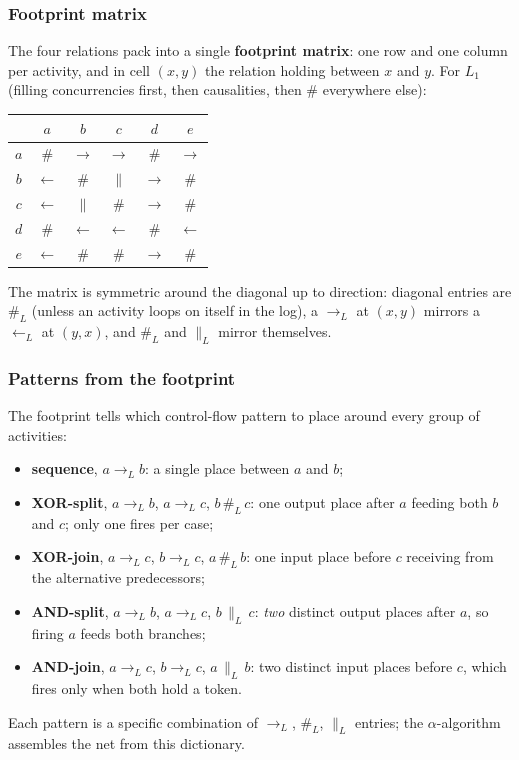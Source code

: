 \subsubsection{Footprint matrix}

The four relations pack into a single \textbf{footprint matrix}: one row and one column per activity, and in cell $(x, y)$ the relation holding between $x$ and $y$. For $L_1$ (filling concurrencies first, then causalities, then $\#$ everywhere else):
\begin{center}
\small
\begin{tabular}{c|ccccc}
      & $a$        & $b$           & $c$          & $d$           & $e$            \\
\hline
$a$   & $\#$       & $\to$         & $\to$        & $\#$          & $\to$          \\
$b$   & $\leftarrow$ & $\#$        & $\|$         & $\to$         & $\#$           \\
$c$   & $\leftarrow$ & $\|$        & $\#$         & $\to$         & $\#$           \\
$d$   & $\#$       & $\leftarrow$  & $\leftarrow$ & $\#$          & $\leftarrow$   \\
$e$   & $\leftarrow$ & $\#$        & $\#$         & $\to$         & $\#$           \\
\end{tabular}
\end{center}
The matrix is symmetric around the diagonal up to direction: diagonal entries are $\#_L$ (unless an activity loops on itself in the log), a $\to_L$ at $(x, y)$ mirrors a $\leftarrow_L$ at $(y, x)$, and $\#_L$ and $\|_L$ mirror themselves.

\subsubsection{Patterns from the footprint}

The footprint tells which control-flow pattern to place around every group of activities:
\begin{itemize}
  \item \textbf{sequence}, $a \to_L b$: a single place between $a$ and $b$;
  \item \textbf{XOR-split}, $a \to_L b$, $a \to_L c$, $b \,\#_L\, c$: one output place after $a$ feeding both $b$ and $c$; only one fires per case;
  \item \textbf{XOR-join}, $a \to_L c$, $b \to_L c$, $a \,\#_L\, b$: one input place before $c$ receiving from the alternative predecessors;
  \item \textbf{AND-split}, $a \to_L b$, $a \to_L c$, $b \,\|_L\, c$: \emph{two} distinct output places after $a$, so firing $a$ feeds both branches;
  \item \textbf{AND-join}, $a \to_L c$, $b \to_L c$, $a \,\|_L\, b$: two distinct input places before $c$, which fires only when both hold a token.
\end{itemize}
Each pattern is a specific combination of $\to_L$, $\#_L$, $\|_L$ entries; the $\alpha$-algorithm assembles the net from this dictionary.

